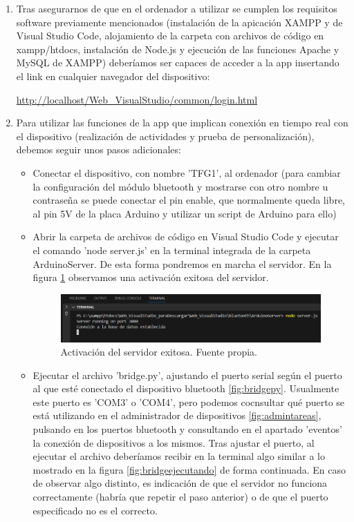 \begin{enumerate}
    \item Tras asegurarnos de que en el ordenador a utilizar se cumplen los requisitos software previamente mencionados (instalación de la apicación XAMPP y de Visual Studio Code, alojamiento de la carpeta con archivos de código en xampp/htdocs, instalación de Node.js y ejecución de las funciones Apache y MySQL de XAMPP) deberíamos ser capaces de acceder a la app insertando el link en cualquier navegador del dispositivo:
    
    \url{http://localhost/Web_VisualStudio/common/login.html} 
    \item Para utilizar las funciones de la app que implican conexión en tiempo real con el dispositivo (realización de actividades y prueba de personalización), debemos seguir unos pasos adicionales:
    \begin{itemize}
        \item Conectar el dispositivo, con nombre 'TFG1', al ordenador (para cambiar la configuración del módulo bluetooth y mostrarse con otro nombre u contraseña se puede conectar el pin enable, que normalmente queda libre, al pin 5V de la placa Arduino y utilizar un script de Arduino para ello)
        \item Abrir la carpeta de archivos de código en Visual Studio Code y ejecutar el comando 'node server.js' en la terminal integrada de la carpeta ArduinoServer. De esta forma pondremos en marcha el servidor. En la figura \ref{fig:servidor} observamos una activación exitosa del servidor.
            \begin{figure}[h]
                \centering
                \includegraphics[width=1\textwidth]{img/servidor.png}
                \caption{Activación del servidor exitosa. Fuente propia.}
                \label{fig:servidor}
            \end{figure}
        \item Ejecutar el archivo 'bridge.py', ajustando el puerto serial según el puerto al que esté conectado el dispositivo bluetooth \ref{fig:bridgepy}. Usualmente este puerto es 'COM3' o 'COM4', pero podemos cocnsultar qué puerto se está utilizando en el administrador de dispositivos \ref{fig:admintareas}, pulsando en los puertos bluetooth y consultando en el apartado 'eventos' la conexión de dispositivos a los mismos. Tras ajustar el puerto, al ejecutar el archivo deberíamos recibir en la terminal algo similar a lo mostrado en la figura \ref{fig:bridgeejecutando} de forma continuada. En caso de observar algo distinto, es indicación de que el servidor no funciona correctamente (habría que repetir el paso anterior) o de que el puerto especificado no es el correcto.

\end{itemize}
\end{enumerate}
